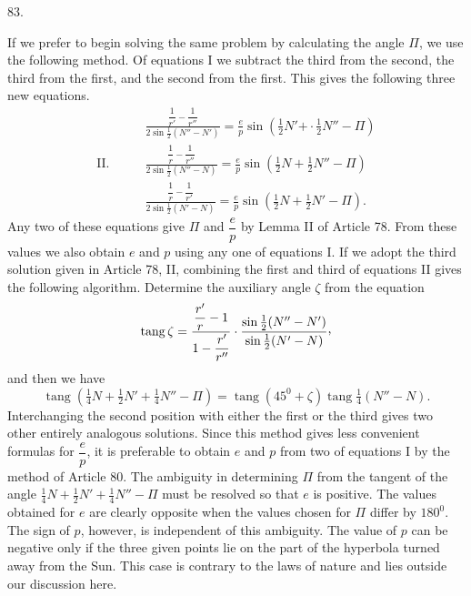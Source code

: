 \par{}\medskip
\hypertarget{native-112-article083}{}
\begin{center}83.\end{center}
If we prefer to begin solving the same problem by calculating the angle $\Pi$, we use the following method. Of equations I we subtract the third from the second, the third from the first, and the second from the first. This gives the following three new equations.
\[
\begin{aligned}
&\frac{\dfrac1{r'}-\dfrac1{r''}}{2\sin\tfrac12(N''-N')}=\frac{e}{p}\sin(\tfrac12N'+\mathpunct{\cdot}\tfrac12N''-\Pi)\\[6pt]
\mathrm{II.}\qquad&\frac{\dfrac1r-\dfrac1{r''}}{2\sin\tfrac12(N''-N)}=\frac{e}{p}\sin(\tfrac12N+\tfrac12N''-\Pi)\\[6pt]
&\frac{\dfrac1r-\dfrac1{r'}}{2\sin\tfrac12(N'-N)}=\frac{e}{p}\sin(\tfrac12N+\tfrac12N'-\Pi).
\end{aligned}
\]
Any two of these equations give $\Pi$ and $\dfrac{e}{p}$ by Lemma II of Article 78. From these values we also obtain $e$ and $p$ using any one of equations I. If we adopt the third solution given in Article 78, II, combining the first and third of equations II gives the following algorithm. Determine the auxiliary angle $\zeta$ from the equation
\[
\operatorname{tang}\zeta=\frac{\dfrac{r'}r-1}{1-\dfrac{r'}{r''}}\cdot\frac{\sin\tfrac12(N''-N')}{\sin\tfrac12(N'-N)}\mathpunct{\raisebox{.45ex}{,}}
\]
and then we have
\[
\operatorname{tang}(\tfrac14N+\tfrac12N'+\tfrac14N''-\Pi)=\operatorname{tang}(45^0+\zeta)\operatorname{tang}\tfrac14(N''-N).
\]
Interchanging the second position with either the first or the third gives two other entirely analogous solutions. Since this method gives less convenient formulas for $\dfrac{e}{p}$, it is preferable to obtain $e$ and $p$ from two of equations I by the method of Article 80. The ambiguity in determining $\Pi$ from the tangent of the angle $\tfrac14N+\tfrac12N'+\tfrac14N''-\Pi$ must be resolved so that $e$ is positive. The values obtained for $e$ are clearly opposite when the values chosen for $\Pi$ differ by $180^0$. The sign of $p$, however, is independent of this ambiguity. The value of $p$ can be negative only if the three given points lie on the part of the hyperbola turned away from the Sun. This case is contrary to the laws of nature and lies outside our discussion here.

